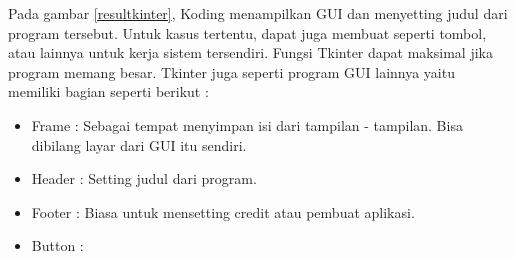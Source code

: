 Pada gambar \ref{resultkinter}, Koding menampilkan GUI dan menyetting judul dari program tersebut. Untuk kasus tertentu, dapat juga membuat seperti tombol, atau lainnya untuk kerja sistem tersendiri. Fungsi Tkinter dapat maksimal jika program memang besar. Tkinter juga seperti program GUI lainnya yaitu memiliki bagian seperti berikut : 
\begin{itemize}
	\item Frame : Sebagai tempat menyimpan isi dari tampilan - tampilan. Bisa dibilang layar dari GUI itu sendiri.	
	\item Header : Setting judul dari program.
	\item Footer : Biasa untuk mensetting credit atau pembuat aplikasi.
	\item Button : 
\end{itemize}